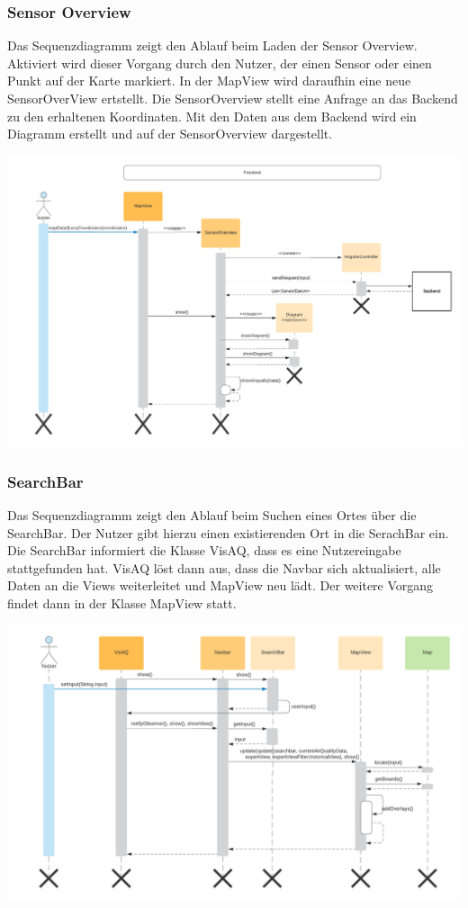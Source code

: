 \subsubsection{Sensor Overview}
\label{Screenshots}
 Das Sequenzdiagramm zeigt den Ablauf beim Laden der Sensor Overview. Aktiviert wird dieser Vorgang durch den Nutzer, der einen Sensor oder einen Punkt auf der Karte markiert. In der MapView wird daraufhin eine neue SensorOverView ertstellt. Die SensorOverview stellt eine Anfrage an das Backend zu den erhaltenen Koordinaten. Mit den Daten aus dem Backend wird ein Diagramm erstellt und auf der SensorOverview dargestellt.
\begin{center}
	\includegraphics[width=1\textwidth]{media/frontend/sequence-diagram/sequenceSensorOverView.png} 
\end{center}

\subsubsection{SearchBar}
\label{Screenshots}
Das Sequenzdiagramm zeigt den Ablauf beim Suchen eines Ortes über die SearchBar. Der Nutzer gibt hierzu einen existierenden Ort in die SerachBar ein. Die SearchBar informiert die Klasse VisAQ, dass es eine Nutzereingabe stattgefunden hat. VisAQ löst dann aus, dass die Navbar sich aktualisiert, alle Daten an die Views weiterleitet und MapView neu lädt. Der weitere Vorgang findet dann in der Klasse MapView statt.
\begin{center}
	\includegraphics[width=1\textwidth]{media/frontend/sequence-diagram/sequenceSearchbar.png} 
\end{center}

